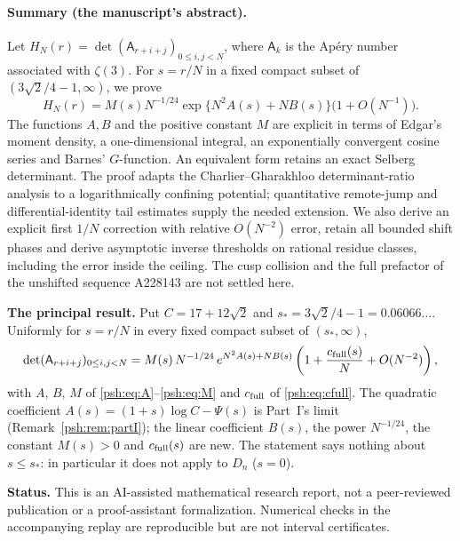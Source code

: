 \documentclass[11pt,a4paper]{article}
\numberwithin{equation}{section}
\theoremstyle{remark}\newtheorem{remark}[theorem]{Remark}
\newcommand{\A}{\mathsf A}
\begin{document}
\paragraph{Summary (the manuscript's abstract).}
Let $H_N(r)=\det(\A_{r+i+j})_{0\leq i,j<N}$, where $\A_k$ is the
Ap\'ery number associated with $\zeta(3)$. For $s=r/N$ in a fixed compact
subset of $(3\sqrt2/4-1,\infty)$, we prove
\[
 H_N(r)=M(s)N^{-1/24}\exp\{N^2 A(s)+N B(s)\}
 \bigl(1+O(N^{-1})\bigr).
\]
The functions $A,B$ and the positive constant $M$ are explicit in terms of
Edgar's moment density, a one-dimensional integral, an exponentially
convergent cosine series and Barnes' $G$-function. An equivalent form
retains an exact Selberg determinant. The proof adapts the
Charlier--Gharakhloo determinant-ratio analysis to a logarithmically
confining potential; quantitative remote-jump and differential-identity
tail estimates supply the needed extension. We also derive an explicit
first $1/N$ correction with relative $O(N^{-2})$ error, retain all bounded
shift phases and derive asymptotic inverse thresholds on rational residue
classes, including the error inside the ceiling. The cusp collision and
the full prefactor of the unshifted sequence A228143 are not settled here.

\begin{resultbox}
\textbf{The principal result.} Put $C=17+12\sqrt2$ and
$s_*=3\sqrt2/4-1=0.06066\ldots$. Uniformly for $s=r/N$ in every fixed
compact subset of $(s_*,\infty)$,
\[
 \det(\A_{r+i+j})_{0\leq i,j<N}
 =M(s)\,N^{-1/24}\,e^{N^2A(s)+NB(s)}
 \left(1+\frac{c_{\rm full}(s)}N+O(N^{-2})\right),
\]
with $A$, $B$, $M$ of \eqref{psh:eq:A}--\eqref{psh:eq:M} and $c_{\rm full}$
of \eqref{psh:eq:cfull}. The quadratic coefficient
$A(s)=(1+s)\log C-\Psi(s)$ is Part~I's limit (Remark~\ref{psh:rem:partI});
the linear coefficient $B(s)$, the power $N^{-1/24}$, the constant $M(s)>0$
and $c_{\rm full}(s)$ are new. The statement says nothing about $s\leq s_*$:
in particular it does not apply to $D_n$ ($s=0$).
\end{resultbox}

\noindent\textbf{Status.} This is an AI-assisted mathematical research
report, not a peer-reviewed publication or a proof-assistant formalization.
Numerical checks in the accompanying replay are reproducible but are not
interval certificates.
\end{document}
